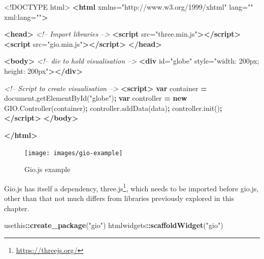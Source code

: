 \documentclass[10pt,]{krantz}
\makeatletter
\newenvironment{Shaded}{\begin{snugshade}}{\end{snugshade}}
\newcommand{\AttributeTok}[1]{\textcolor[rgb]{0.61,0.61,0.61}{#1}}
\newcommand{\CommentTok}[1]{\textcolor[rgb]{0.37,0.37,0.37}{\textit{#1}}}
\newcommand{\DataTypeTok}[1]{\textcolor[rgb]{0.27,0.27,0.27}{#1}}
\newcommand{\KeywordTok}[1]{\textcolor[rgb]{0.27,0.27,0.27}{\textbf{#1}}}
\newcommand{\NormalTok}[1]{#1}
\newcommand{\OperatorTok}[1]{\textcolor[rgb]{0.43,0.43,0.43}{\textbf{#1}}}
\newcommand{\OtherTok}[1]{\textcolor[rgb]{0.37,0.37,0.37}{#1}}
\newcommand{\StringTok}[1]{\textcolor[rgb]{0.5,0.5,0.5}{#1}}
\newcommand{\VariableTok}[1]{\textcolor[rgb]{0,0,0}{#1}}
\renewcommand{\href}[2]{#2\footnote{\url{#1}}}
\newenvironment{kframe}{%
\medskip{}
\setlength{\fboxsep}{.8em}
 \def\at@end@of@kframe{}%
 \ifinner\ifhmode%
  \def\at@end@of@kframe{\end{minipage}}%
  \begin{minipage}{\columnwidth}%
 \fi\fi%
 \def\FrameCommand##1{\hskip\@totalleftmargin \hskip-\fboxsep
 \colorbox{shadecolor}{##1}\hskip-\fboxsep
     \hskip-\linewidth \hskip-\@totalleftmargin \hskip\columnwidth}%
 \MakeFramed {\advance\hsize-\width
   \@totalleftmargin\z@ \linewidth\hsize
   \@setminipage}}%
 {\par\unskip\endMakeFramed%
 \at@end@of@kframe}
\renewenvironment{Shaded}{\begin{kframe}}{\end{kframe}}
\makeatother
\begin{document}
\begin{Shaded}
\begin{Highlighting}[]
\DataTypeTok{<!DOCTYPE }\NormalTok{html}\DataTypeTok{>}
\KeywordTok{<html}\OtherTok{ xmlns=}\StringTok{"http://www.w3.org/1999/xhtml"}\OtherTok{ lang=}\StringTok{""}\OtherTok{ xml:lang=}\StringTok{""}\KeywordTok{>}

\KeywordTok{<head>}
  \CommentTok{<!-- Import libraries -->}
  \KeywordTok{<script}\OtherTok{ src=}\StringTok{"three.min.js"}\KeywordTok{></script>}
  \KeywordTok{<script}\OtherTok{ src=}\StringTok{"gio.min.js"}\KeywordTok{></script>}
\KeywordTok{</head>}

\KeywordTok{<body>}
  \CommentTok{<!-- div to hold visualisation -->}
  \KeywordTok{<div}\OtherTok{ id=}\StringTok{"globe"}\OtherTok{ style=}\StringTok{"width: 200px; height: 200px"}\KeywordTok{></div>}

  \CommentTok{<!-- Script to create visualisation -->}
  \KeywordTok{<script>}
    \KeywordTok{var}\NormalTok{ container }\OperatorTok{=} \VariableTok{document}\NormalTok{.}\AttributeTok{getElementById}\NormalTok{(}\StringTok{"globe"}\NormalTok{)}\OperatorTok{;}
    \KeywordTok{var}\NormalTok{ controller }\OperatorTok{=} \KeywordTok{new} \VariableTok{GIO}\NormalTok{.}\AttributeTok{Controller}\NormalTok{(container)}\OperatorTok{;}
    \VariableTok{controller}\NormalTok{.}\AttributeTok{addData}\NormalTok{(data)}\OperatorTok{;}
    \VariableTok{controller}\NormalTok{.}\AttributeTok{init}\NormalTok{()}\OperatorTok{;}
  \KeywordTok{</script>}
\KeywordTok{</body>}

\KeywordTok{</html>}
\end{Highlighting}
\end{Shaded}

\begin{figure}[H]

{\centering \texttt{[image: images/gio-example]} 

}

\caption{Gio.js example}\label{fig:gio-example}
\end{figure}

Gio.js has itself a dependency, \href{https://threejs.org/}{three.js}, which needs to be imported before gio.js, other than that not much differs from libraries previously explored in this chapter.

\begin{Shaded}
\begin{Highlighting}[]
\NormalTok{usethis}\OperatorTok{::}\KeywordTok{create_package}\NormalTok{(}\StringTok{"gio"}\NormalTok{)}
\NormalTok{htmlwidgets}\OperatorTok{::}\KeywordTok{scaffoldWidget}\NormalTok{(}\StringTok{"gio"}\NormalTok{)}
\end{Highlighting}
\end{Shaded}
\end{document}
